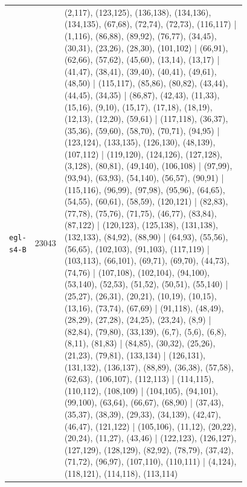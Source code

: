 \begin{landscape}
\begin{longtable}{lr>{\tiny\raggedright\arraybackslash}p{0.78\linewidth}}
\texttt{egl-s4-B} & 23043 & (2,117), (123,125), (136,138), (134,136), (134,135), (67,68), (72,74), (72,73), (116,117) | (1,116), (86,88), (89,92), (76,77), (34,45), (30,31), (23,26), (28,30), (101,102) | (66,91), (62,66), (57,62), (45,60), (13,14), (13,17) | (41,47), (38,41), (39,40), (40,41), (49,61), (48,50) | (115,117), (85,86), (80,82), (43,44), (44,45), (34,35) | (86,87), (42,43), (11,33), (15,16), (9,10), (15,17), (17,18), (18,19), (12,13), (12,20), (59,61) | (117,118), (36,37), (35,36), (59,60), (58,70), (70,71), (94,95) | (123,124), (133,135), (126,130), (48,139), (107,112) | (119,120), (124,126), (127,128), (3,128), (80,81), (49,140), (106,108) | (97,99), (93,94), (63,93), (54,140), (56,57), (90,91) | (115,116), (96,99), (97,98), (95,96), (64,65), (54,55), (60,61), (58,59), (120,121) | (82,83), (77,78), (75,76), (71,75), (46,77), (83,84), (87,122) | (120,123), (125,138), (131,138), (132,133), (84,92), (88,90) | (64,93), (55,56), (56,65), (102,103), (91,103), (117,119) | (103,113), (66,101), (69,71), (69,70), (44,73), (74,76) | (107,108), (102,104), (94,100), (53,140), (52,53), (51,52), (50,51), (55,140) | (25,27), (26,31), (20,21), (10,19), (10,15), (13,16), (73,74), (67,69) | (91,118), (48,49), (28,29), (27,28), (24,25), (23,24), (8,9) | (82,84), (79,80), (33,139), (6,7), (5,6), (6,8), (8,11), (81,83) | (84,85), (30,32), (25,26), (21,23), (79,81), (133,134) | (126,131), (131,132), (136,137), (88,89), (36,38), (57,58), (62,63), (106,107), (112,113) | (114,115), (110,112), (108,109) | (104,105), (94,101), (99,100), (63,64), (66,67), (68,90) | (37,43), (35,37), (38,39), (29,33), (34,139), (42,47), (46,47), (121,122) | (105,106), (11,12), (20,22), (20,24), (11,27), (43,46) | (122,123), (126,127), (127,129), (128,129), (82,92), (78,79), (37,42), (71,72), (96,97), (107,110), (110,111) | (4,124), (118,121), (114,118), (113,114) \\[2pt]

\end{longtable}
\end{landscape}
